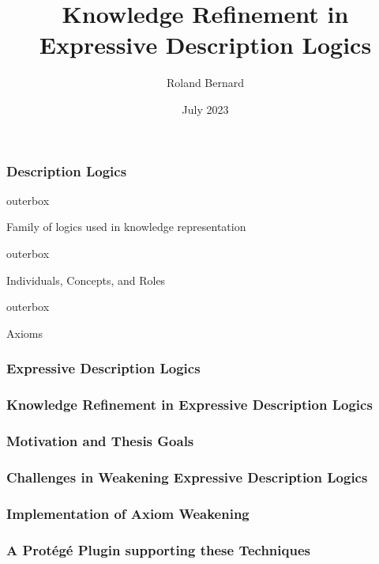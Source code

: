 \documentclass[aspectratio=169]{beamer}
\title{Knowledge Refinement in\\Expressive Description Logics}
\author{Roland Bernard}
\date{July 2023}
\newlength{\offsetpage}
\newenvironment{narrowpage}[1][5mm]{
  \setlength{\offsetpage}{#1}
  \begin{adjustwidth}{\offsetpage}{\offsetpage}
  \addtolength{\textwidth}{-2\offsetpage}
}{\end{adjustwidth}}
\newenvironment{items}{\begin{narrowpage}\vfill}{\end{narrowpage}}
\newenvironment{oitem}[1][\scriptsize\raisebox{0.6mm}{\color{unibzblue} $\blacktriangleright$}]{\hfill\begin{beamercolorbox}[rounded=true,colsep=2mm]{outerbox}\parbox[t]{5mm}{#1}\begin{minipage}[t]{\textwidth}}{\end{minipage}\end{beamercolorbox}\hfill\vfill}
\begin{document}
\frame{\titlepage}

\begin{frame}
  \frametitle{Description Logics}
  \begin{items}
    \begin{oitem}
      Family of logics used in knowledge representation
    \end{oitem}
    \begin{oitem}
      Individuals, Concepts, and Roles
    \end{oitem}
    \begin{oitem}
      Axioms
    \end{oitem}
  \end{items}
\end{frame}

\begin{frame}
  \frametitle{Expressive \textnormal{Description Logics}}
\end{frame}

\begin{frame}
  \frametitle{Knowledge Refinement \textnormal{in Expressive Description Logics}}
\end{frame}

\begin{frame}
  \frametitle{Motivation and Thesis Goals}
\end{frame}

\begin{frame}
  \frametitle{Challenges in Weakening Expressive Description Logics}
\end{frame}

\begin{frame}
  \frametitle{Implementation of Axiom Weakening}
\end{frame}

\begin{frame}
  \frametitle{A Protégé Plugin supporting these Techniques}
\end{frame}
\end{document}

